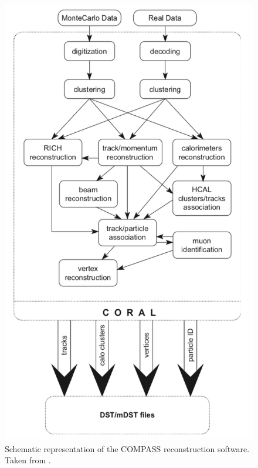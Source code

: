 \begin{figure}[!h]
  \centering
	\includegraphics[scale=0.55]{./gfx/CORAL.png}
	\caption{Schematic representation of the COMPASS reconstruction software. Taken from \cite{NIM}.}
	\label{pic:CORAL}
\end{figure}
